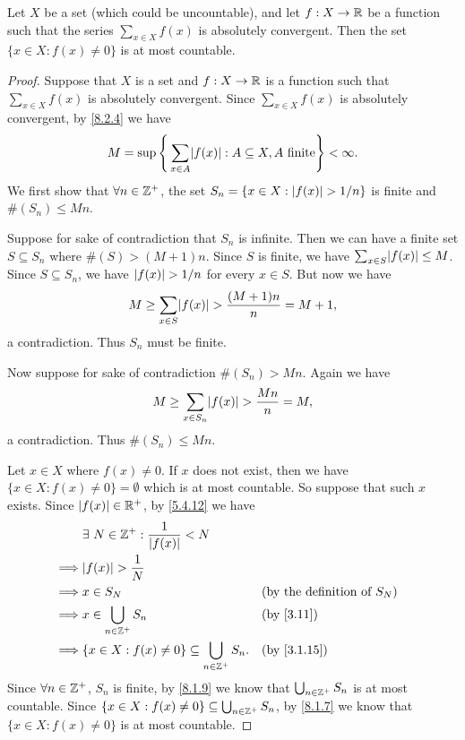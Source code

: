 \begin{lem}\label{8.2.5}
  Let \(X\) be a set (which could be uncountable), and let \(f : X \to \mathbb{R}\) be a function such that the series \(\sum_{x \in X} f(x)\) is absolutely convergent.
  Then the set \(\{x \in X : f(x) \neq 0\}\) is at most countable.
\end{lem}

\begin{proof}
  Suppose that \(X\) is a set and \(f : X \to \mathbb{R}\) is a function such that \(\sum_{x \in X} f(x)\) is absolutely convergent.
  Since \(\sum_{x \in X} f(x)\) is absolutely convergent, by \cref{8.2.4} we have
  \[
    M = \sup\Bigg\{\sum_{x \in A} \abs{f(x)} : A \subseteq X, A \text{ finite}\Bigg\} < \infty.
  \]
  We first show that \(\forall n \in \mathbb{Z}^+\), the set \(S_n = \{x \in X : \left\lvert f(x)\right\rvert > 1 / n\}\) is finite and \(\#(S_n) \leq Mn\).

  Suppose for sake of contradiction that \(S_n\) is infinite.
  Then we can have a finite set \(S \subseteq S_n\) where \(\#(S) > (M + 1)n\).
  Since \(S\) is finite, we have \(\sum_{x \in S} \abs{f(x)} \leq M\).
  Since \(S \subseteq S_n\), we have \(\left\lvert f(x)\right\rvert > 1 / n\) for every \(x \in S\).
  But now we have
  \[
    M \geq \sum_{x \in S} \abs{f(x)} > \dfrac{(M + 1)n}{n} = M + 1,
  \]
  a contradiction.
  Thus \(S_n\) must be finite.

  Now suppose for sake of contradiction \(\#(S_n) > Mn\).
  Again we have
  \[
    M \geq \sum_{x \in S_n} \abs{f(x)} > \dfrac{Mn}{n} = M,
  \]
  a contradiction.
  Thus \(\#(S_n) \leq Mn\).

  Let \(x \in X\) where \(f(x) \neq 0\).
  If \(x\) does not exist, then we have \(\{x \in X : f(x) \neq 0\} = \emptyset\) which is at most countable.
  So suppose that such \(x\) exists.
  Since \(\left\lvert f(x)\right\rvert \in \mathbb{R}^+\), by \cref{5.4.12} we have
  \begin{align*}
             & \exists\ N \in \Z^+ : \dfrac{1}{\abs{f(x)}} < N                                                          \\
    \implies & \abs{f(x)} > \dfrac{1}{N}                                                                                \\
    \implies & x \in S_N                                                     &  & \text{(by the definition of \(S_N\))} \\
    \implies & x \in \bigcup_{n \in \Z^+} S_n                                &  & \text{(by \cref{3.11})}               \\
    \implies & \{x \in X : f(x) \neq 0\} \subseteq \bigcup_{n \in \Z^+} S_n. &  & \text{(by \cref{3.1.15})}
  \end{align*}
  Since \(\forall n \in \mathbb{Z}^+\), \(S_n\) is finite, by \cref{8.1.9} we know that \(\bigcup_{n \in \mathbb{Z}^+} S_n\) is at most countable.
  Since \(\{x \in X : f(x) \neq 0\} \subseteq \bigcup_{n \in \mathbb{Z}^+} S_n\), by \cref{8.1.7} we know that \(\{x \in X : f(x) \neq 0\}\) is at most countable.
\end{proof}

